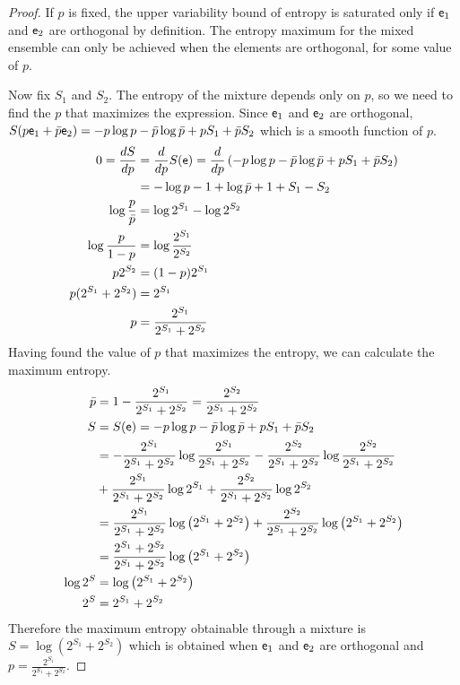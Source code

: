 \begin{proof}
	If $p$ is fixed, the upper variability bound of entropy is saturated only if $\mathsf{e}_1$ and $\mathsf{e}_2$ are orthogonal by definition. The entropy maximum for the mixed ensemble can only be achieved when the elements are orthogonal, for some value of $p$.
	
	Now fix $S_1$ and $S_2$. The entropy of the mixture depends only on $p$, so we need to find the $p$ that maximizes the expression. Since $\mathsf{e}_1$ and $\mathsf{e}_2$ are orthogonal, $S(p \mathsf{e}_1 + \bar{p}\mathsf{e}_2) =  - p \log p - \bar{p} \log \bar{p} + p S_1 + \bar{p} S_2$ which is a smooth function of $p$.
	\begin{equation}
		\begin{aligned}
			0 = \frac{dS}{dp} &= \frac{d}{dp} S(\mathsf{e}) =\frac{d}{dp} \left( - p \log p - \bar{p} \log \bar{p} + p S_1 + \bar{p} S_2 \right) \\
			&= - \log p - 1 + \log \bar{p} + 1 + S_1 - S_2 \\
			\log \frac{p}{\bar{p}} &= \log 2^{S_1} - \log 2^{S_2} \\
			\log \frac{p}{1-p} &= \log \frac{2^{S_1}}{2^{S_2}}  \\
			p 2^{S_2} &= (1-p) 2^{S_1}  \\
			p (2^{S_1} + 2^{S_2}) &= 2^{S_1}  \\
			p &= \frac{2^{S_1}}{2^{S_1} + 2^{S_2}}  \\
		\end{aligned}
	\end{equation}
	Having found the value of $p$ that maximizes the entropy, we can calculate the maximum entropy.
	\begin{equation}
	\begin{aligned}
		\bar{p} &= 1- \frac{2^{S_1}}{2^{S_1} + 2^{S_2}} = \frac{2^{S_2}}{2^{S_1} + 2^{S_2}} \\
		S &= S(\mathsf{e}) = - p \log p - \bar{p} \log \bar{p} + p S_1 + \bar{p} S_2  \\
		&= - \frac{2^{S_1}}{2^{S_1} + 2^{S_2}} \log \frac{2^{S_1}}{2^{S_1} + 2^{S_2}} - \frac{2^{S_2}}{2^{S_1} + 2^{S_2}} \log \frac{2^{S_2}}{2^{S_1} + 2^{S_2}} \\
		&+ \frac{2^{S_1}}{2^{S_1} + 2^{S_2}} \log 2^{S_1} + \frac{2^{S_2}}{2^{S_1} + 2^{S_2}} \log 2^{S_2} \\
		&= \frac{2^{S_1}}{2^{S_1} + 2^{S_2}} \log \left( 2^{S_1} + 2^{S_2} \right) + \frac{2^{S_2}}{2^{S_1} + 2^{S_2}} \log \left( 2^{S_1} + 2^{S_2} \right) \\
		&= \frac{2^{S_1} + 2^{S_2}}{2^{S_1} + 2^{S_2}} \log \left( 2^{S_1} + 2^{S_2} \right) \\
		\log 2^S &= \log \left( 2^{S_1} + 2^{S_2} \right) \\
		2^S &=  2^{S_1} + 2^{S_2}  \\
	\end{aligned}
	\end{equation}
	Therefore the maximum entropy obtainable through a mixture is $S = \log (2^{S_1} + 2^{S_2})$ which is obtained when $\mathsf{e}_1$ and $\mathsf{e}_2$ are orthogonal and $p = \frac{2^{S_1}}{2^{S_1} + 2^{S_2}}$.
\end{proof}


